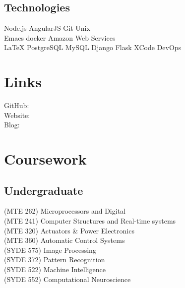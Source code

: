 \documentclass[]{deedy-resume-openfont}
\begin{document}
\begin{minipage}[t]{0.33\textwidth}
\subsection{Technologies}
Node.js \textbullet{} AngularJS \textbullet{} Git \textbullet{} Unix \\
Emacs \textbullet{} docker \textbullet{} Amazon Web Services\\
LaTeX \textbullet{} PostgreSQL \textbullet{} MySQL
Django \textbullet{} Flask \textbullet{} XCode \textbullet{} DevOps
\sectionsep


\section{Links}
GitHub: \href{https://github.com/prajnak}{} \\
Website:  \href{https://prajis.me}{} \\
Blog:  \href{https://prajis.me/blog}{} \\
\sectionsep


\section{Coursework}
\subsection{Undergraduate}
(MTE 262) Microprocessors and Digital\\
(MTE 241) Computer Structures and Real-time systems \\
(MTE 320) Actuators \& Power Electronics\\
(MTE 360) Automatic Control Systems\\
(SYDE 575) Image Processing\\
(SYDE 372) Pattern Recognition\\
(SYDE 522) Machine Intelligence\\
(SYDE 552) Computational Neuroscience\\
\sectionsep


%
%

\end{minipage}
\end{document}
